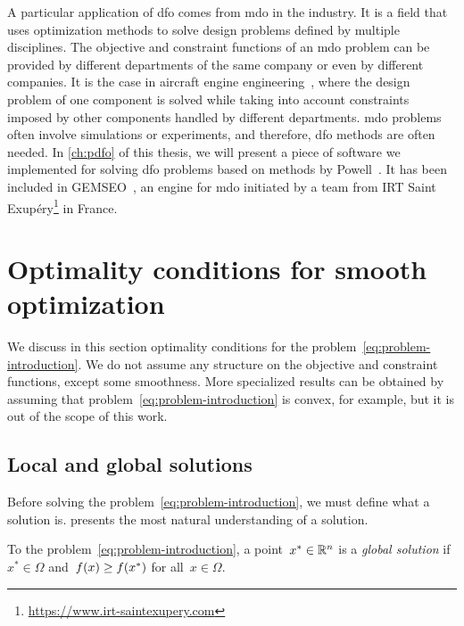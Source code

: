 A particular application of \gls{dfo} comes from \gls{mdo} in the industry.
It is a field that uses optimization methods to solve design problems defined by multiple disciplines.
The objective and constraint functions of an \gls{mdo} problem can be provided by different departments of the same company or even by different companies.
It is the case in aircraft engine engineering~\cite{Gazaix_Etal_2019}, where the design problem of one component is solved while taking into account constraints imposed by other components handled by different departments.
\Gls{mdo} problems often involve simulations or experiments, and therefore, \gls{dfo} methods are often needed.
In \cref{ch:pdfo} of this thesis, we will present a piece of software we implemented for solving \gls{dfo} problems based on methods by Powell~\cite{Powell_1994,Powell_2002,Powell_2006,Powell_2009,Powell_2015}.
It has been included in GEMSEO~\cite{Gallard_Etal_2018}, an engine for \gls{mdo} initiated by a team from IRT Saint Exup{\'{e}}ry\footnote{\url{https://www.irt-saintexupery.com}} in France.

\section{Optimality conditions for smooth optimization}

We discuss in this section optimality conditions for the problem~\cref{eq:problem-introduction}.
We do not assume any structure on the objective and constraint functions, except some smoothness.
More specialized results can be obtained by assuming that problem~\cref{eq:problem-introduction} is convex, for example, but it is out of the scope of this work.

\subsection{Local and global solutions}

Before solving the problem~\cref{eq:problem-introduction}, we must define what a solution is.
 presents the most natural understanding of a solution.

\begin{definition}
    \label{def:global-solution}
    To the problem~\cref{eq:problem-introduction}, a point~$x^{\ast} \in \mathbb{R}^n$ is a \emph{global solution} if~$x^{\ast} \in \Omega$ and~$f(x) \ge f(x^{\ast})$ for all~$x \in \Omega$.
\end{definition}

